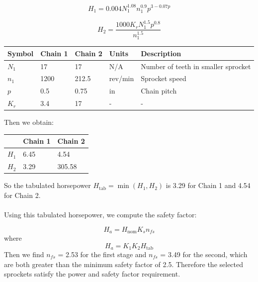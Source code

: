 \documentclass[letterpaper,12pt]{article}
\begin{document}
\begin{equation}
    H_1 = 0.004 N_1^{1.08} n_1^{0.9} p^{3-0.07p}
\end{equation}

\begin{equation}
    H_2 = \frac{1000 K_r N_1^{1.5} p^{0.8}}{n_1^{1.5}}
\end{equation}

\begin{center}
	\begin{tabular}{ |p{1.5cm}||p{1.5cm}|p{1.5cm}|p{2cm}|p{7cm}|  }
		\hline
		Symbol & Chain 1 & Chain 2 & Units & Description\\
		\hline
		$N_1$ & 17 & 17 & N/A & Number of teeth in smaller sprocket\\
		$n_1$ & 1200 & 212.5 & rev/min & Sprocket speed  \\
        $p$ & 0.5 & 0.75 & in  & Chain pitch\\			
		$K_r$ & 3.4 & 17 & -  & -\\
		\hline
	\end{tabular}
\end{center}
Then we obtain:
\begin{center}
	\begin{tabular}{|p{1.5cm}|p{1.5cm}|p{1.5cm}| }
		\hline
		& Chain 1 & Chain 2\\
		\hline
		$H_1$ & 6.45 & 4.54\\
		$H_2$ & 3.29 & 305.58\\
		\hline
	\end{tabular}
\end{center}
So the tabulated horsepower $H_{\text{tab}} = \min(H_1, H_2)$ is 3.29 for Chain 1 and 4.54 for Chain 2.
\\\\
Using this tabulated horsepower, we compute the safety factor:

\begin{equation}
    H_a = H_{\text{nom}} K_s n_{fs} 
\end{equation}
where
\begin{equation}
    H_a = K_1 K_2 H_{\text{tab}}
\end{equation}
Then we find $n_{fs}$ = 2.53 for the first stage and $n_{fs}$ = 3.49 for the second, which are both greater than the minimum safety factor of 2.5. Therefore the selected sprockets satisfy the power and safety factor requirement.
\end{document}
